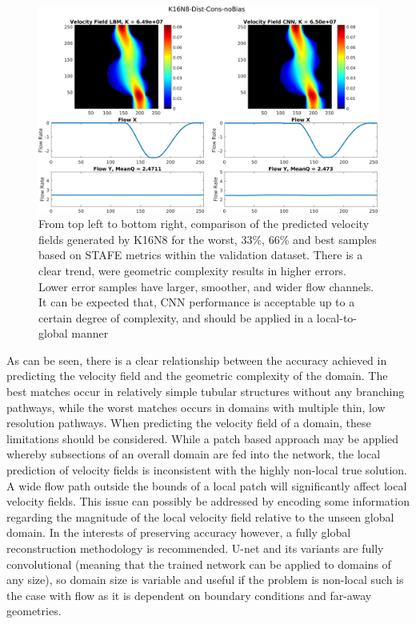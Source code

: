 \documentclass{article}
\begin{document}
\begin{figure}[htp!]
\begin{minipage}[b]{0.49\textwidth}
  \end{minipage}
  \hfill
  \begin{minipage}[b]{0.49\textwidth}
    \includegraphics[width=\textwidth]{figures/velCNNs1667-6.png}
  \end{minipage}
    \caption{From top left to bottom right, comparison of the predicted velocity fields generated by K16N8 for the worst, 33\%, 66\% and best samples based on STAFE metrics within the validation dataset. There is a clear trend, were geometric complexity results in higher errors. Lower error samples have larger, smoother, and wider flow channels. It can be expected that, CNN performance is acceptable up to a certain degree of complexity, and should be applied in a local-to-global manner}
    \label{fig:velComparek16n8binworst}
\end{figure}

As can be seen, there is a clear relationship between the accuracy achieved in predicting the velocity field and the geometric complexity of the domain. The best matches occur in relatively simple tubular structures without any branching pathways, while the worst matches occurs in domains with multiple thin, low resolution pathways. When predicting the velocity field of a domain, these limitations should be considered. While a patch based approach may be applied whereby subsections of an overall domain are fed into the network, the local prediction of velocity fields is inconsistent with the highly non-local true solution. A wide flow path outside the bounds of a local patch will significantly affect local velocity fields. This issue can possibly be addressed by encoding some information regarding the magnitude of the local velocity field relative to the unseen global domain. In the interests of preserving accuracy however, a fully global reconstruction methodology is recommended. U-net and its variants are fully convolutional (meaning that the trained network can be applied to domains of any size), so domain size is variable and useful if the problem is non-local such is the case with flow as it is dependent on boundary conditions and far-away geometries.
\end{document}

